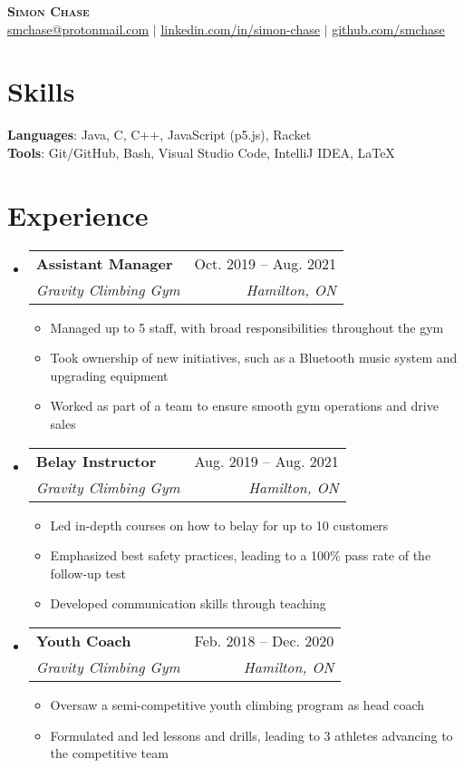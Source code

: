 \documentclass[letterpaper,11pt]{article}
\makeatletter
\newcommand{\resumeItem}[1]{
	\item\small{
		{#1 \vspace{-2pt}}
	}
}
\newcommand{\resumeSubheading}[4]{
	\vspace{-2pt}\item
		\begin{tabular*}{0.97\textwidth}[t]{l@{\extracolsep{\fill}}r}
			\textbf{#1} & #2 \\
			\textit{\small#3} & \textit{\small #4} \\
		\end{tabular*}\vspace{-7pt}
}
\newcommand{\resumeSubHeadingListStart}{\begin{itemize}[leftmargin=0.15in, label={}]}
\newcommand{\resumeSubHeadingListEnd}{\end{itemize}}
\newcommand{\resumeItemListStart}{\begin{itemize}}
\newcommand{\resumeItemListEnd}{\end{itemize}\vspace{-5pt}}
\makeatother
\begin{document}
\begin{center}
    \textbf{\Huge \scshape Simon Chase} \\ \vspace{1pt}
    \small
	\href{mailto:smchase@protonmail.com}{\underline{smchase@protonmail.com}} $|$ 
    \href{https://linkedin.com/in/simon-chase}{\underline{linkedin.com/in/simon-chase}} $|$
    \href{https://github.com/smchase}{\underline{github.com/smchase}}
\end{center}


\section{Skills}
\begin{itemize}[leftmargin=0.15in, label={}]
\small{\item{
	\textbf{Languages}{: Java, C, C++, JavaScript (p5.js), Racket} \\
	\textbf{Tools}{: Git/GitHub, Bash, Visual Studio Code, IntelliJ IDEA, \LaTeX}
}}
\end{itemize}


\section{Experience}
\resumeSubHeadingListStart
	\resumeSubheading
		{Assistant Manager}{Oct. 2019 -- Aug. 2021}
		{Gravity Climbing Gym}{Hamilton, ON}
		\resumeItemListStart
			\resumeItem{Managed up to 5 staff, with broad responsibilities throughout the gym}
			\resumeItem{Took ownership of new initiatives, such as a Bluetooth music system and upgrading equipment}
			\resumeItem{Worked as part of a team to ensure smooth gym operations and drive sales}
		\resumeItemListEnd

	\resumeSubheading
		{Belay Instructor}{Aug. 2019 -- Aug. 2021}
		{Gravity Climbing Gym}{Hamilton, ON}
		\resumeItemListStart
			\resumeItem{Led in-depth courses on how to belay for up to 10 customers}
			\resumeItem{Emphasized best safety practices, leading to a 100\% pass rate of the follow-up test}
			\resumeItem{Developed communication skills through teaching}
		\resumeItemListEnd

	\resumeSubheading
		{Youth Coach}{Feb. 2018 -- Dec. 2020}
		{Gravity Climbing Gym}{Hamilton, ON}
		\resumeItemListStart
			\resumeItem{Oversaw a semi-competitive youth climbing program as head coach}
			\resumeItem{Formulated and led lessons and drills, leading to 3 athletes advancing to the competitive team}
		\resumeItemListEnd
\resumeSubHeadingListEnd
\end{document}
